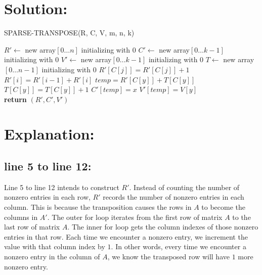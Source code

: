 \documentclass{article}
\begin{document}
\section*{Solution: }
\begin{algorithm}[H]
    \caption{SPARSE-TRANSPOSE(R, C, V, m, n, k)}
    \begin{algorithmic}[1]
        \State $R' \gets$ new array$[0 \dots n]$ initializing with $0$
        \State $C' \gets$ new array$[0 \dots k-1]$ initializing with $0$
        \State $V' \gets$ new array$[0 \dots k-1]$ initializing with $0$
        \State $T \gets$ new array$[0 \dots n-1]$ initializing with $0$
                \State $R'[C[j]] = R'[C[j]]+1$
            \EndFor
        \EndFor
            \State $R'[i] = R'[i-1] + R'[i]$
        \EndFor
                \State $temp = R'[C[y]] + T[C[y]]$
                \State $T[C[y]] = T[C[y]] + 1$
                \State $C'[temp] = x$
                \State $V'[temp] = V[y]$
            \EndFor
        \EndFor\\
        \textbf{return} $(R', C', V')$
    \end{algorithmic}
\end{algorithm}

\section*{Explanation: }
\subsection*{line 5 to line 12: }
Line 5 to line 12 intends to construct $R'$. Instead of counting the number of nonzero entries in each
row, $R'$ records the number of nonzero entries in each column. This is because the transposition causes 
the rows in $A$ to become the columns in $A'$. The outer for loop iterates from the first row of matrix $A$
to the last row of matrix $A$. The inner for loop gets the column indexes of those nonzero entries in that row. 
Each time we encounter a nonzero entry, we increment the value with that column index by $1$. In other words, every
time we encounter a nonzero entry in the column of $A$, we know the transposed row will have $1$ more nonzero entry. \\ \\
\end{document}
